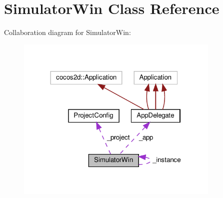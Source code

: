 \hypertarget{classSimulatorWin}{}\section{Simulator\+Win Class Reference}
\label{classSimulatorWin}


Collaboration diagram for Simulator\+Win\+:
\nopagebreak
\begin{figure}[H]
\begin{center}
\leavevmode
\includegraphics[width=276pt]{classSimulatorWin__coll__graph}
\end{center}
\end{figure}

